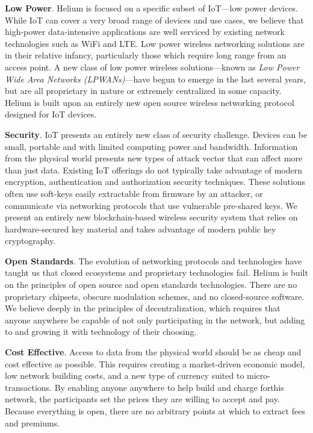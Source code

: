 \documentclass[letterpaper,11pt]{article}
\begin{document}
\textbf{Low Power}. Helium is focused on a specific subset of IoT---low power devices. While IoT can cover a very broad range of devices and use cases, we believe that high-power data-intensive applications are well serviced by existing network technologies such as WiFi and LTE. Low power wireless networking solutions are in their relative infancy, particularly those which require long range from an access point. A new class of low power wireless solutions---known as \emph{Low Power Wide Area Networks (LPWANs)}---have begun to emerge in the last several years, but are all proprietary in nature or extremely centralized in some capacity. Helium is built upon an entirely new open source wireless networking protocol designed for IoT devices.\newline

\textbf{Security}. IoT presents an entirely new class of security challenge. Devices can be small, portable and with limited computing power and bandwidth. Information from the physical world presents new types of attack vector that can affect more than just data. Existing IoT offerings do not typically take advantage of modern encryption, authentication and authorization security techniques. These solutions often use soft-keys easily extractable from firmware by an attacker, or communicate via networking protocols that use vulnerable pre-shared keys. We present an entirely new blockchain-based wireless security system that relies on hardware-secured key material and takes advantage of modern public key cryptography.\newline

\textbf{Open Standards}. The evolution of networking protocols and technologies have taught us that closed ecosystems and proprietary technologies fail. Helium is built on the principles of open source and open standards technologies. There are no proprietary chipsets, obscure modulation schemes, and no closed-source software. We believe deeply in the principles of decentralization, which requires that anyone anywhere be capable of not only participating in the network, but adding to and growing it with technology of their choosing.\newline

\textbf{Cost Effective}. Access to data from the physical world should be as cheap and cost effective as possible. This requires creating a market-driven economic model, low network building costs, and a new type of currency suited to micro-transactions. By enabling anyone anywhere to help build and charge forthis network, the participants set the prices they are willing to accept and pay. Because everything is open, there are no arbitrary points at which to extract fees and premiums. \newline
\end{document}
